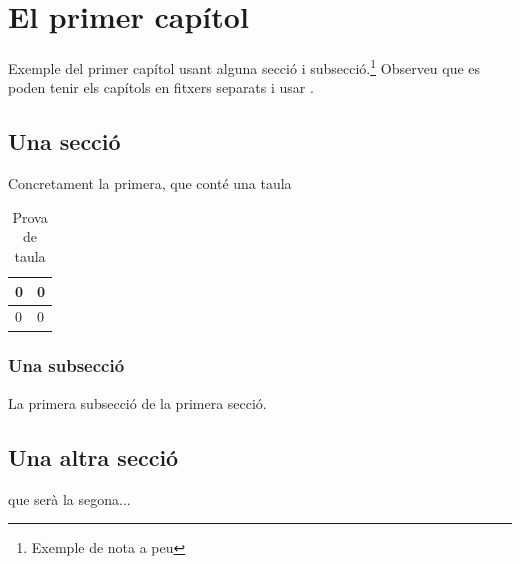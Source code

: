 \documentclass[12pt, a4paper,twoside]{tesi_upf}
\begin{document}
\chapter{El primer capítol}
Exemple del primer capítol usant alguna secció i subsecció.\footnote{Exemple de nota a peu} Observeu que es poden tenir els capítols en fitxers separats i usar \verb++.


\section{Una secció}
Concretament la primera, que conté una taula

\begin{table}[h]
  \centering
  \begin{tabular}{|l|l|}
   \hline
    0 & 0 \\ \hline
    0 & 0 \\ \hline    
  \end{tabular}
  \caption{Prova de taula}

\end{table}

\subsection{Una subsecció}
La primera subsecció de la primera secció.

\section{Una altra secció}
que serà la segona... 
\end{document}
